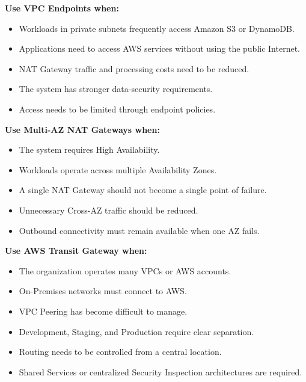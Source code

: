 \vspace{0.5em}\noindent\textbf{Use VPC Endpoints when:}\par

\begin{itemize}
\tightlist
\item
  Workloads in private subnets frequently access Amazon S3 or DynamoDB.
\item
  Applications need to access AWS services without using the public
  Internet.
\item
  NAT Gateway traffic and processing costs need to be reduced.
\item
  The system has stronger data-security requirements.
\item
  Access needs to be limited through endpoint policies.
\end{itemize}

\vspace{0.5em}\noindent\textbf{Use Multi-AZ NAT Gateways
when:}\par

\begin{itemize}
\tightlist
\item
  The system requires High Availability.
\item
  Workloads operate across multiple Availability Zones.
\item
  A single NAT Gateway should not become a single point of failure.
\item
  Unnecessary Cross-AZ traffic should be reduced.
\item
  Outbound connectivity must remain available when one AZ fails.
\end{itemize}

\vspace{0.5em}\noindent\textbf{Use AWS Transit Gateway
when:}\par

\begin{itemize}
\tightlist
\item
  The organization operates many VPCs or AWS accounts.
\item
  On-Premises networks must connect to AWS.
\item
  VPC Peering has become difficult to manage.
\item
  Development, Staging, and Production require clear separation.
\item
  Routing needs to be controlled from a central location.
\item
  Shared Services or centralized Security Inspection architectures are
  required.
\end{itemize}

